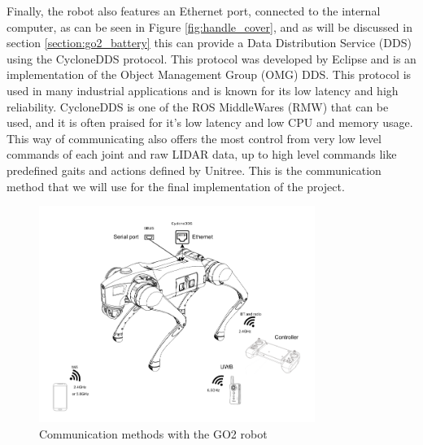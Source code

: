 \documentclass[12pt]{article}
\begin{document}
        Finally, the robot also features an Ethernet port, connected to the internal computer, as can be seen in Figure \ref{fig:handle_cover}, and as will be discussed in section \ref{section:go2_battery} this can provide a Data Distribution Service (DDS) using the CycloneDDS protocol. This protocol was developed by Eclipse and is an implementation of the Object Management Group (OMG) DDS. This protocol is used in many industrial applications and is known for its low latency and high reliability. CycloneDDS is one of the ROS MiddleWares (RMW) that can be used, and it is often praised for it's low latency and low CPU and memory usage. This way of communicating also offers the most control from very low level commands of each joint and raw LIDAR data, up to high level commands like predefined gaits and actions defined by Unitree. This is the communication method that we will use for the final implementation of the project.
    

        \begin{figure}[H]
            \centering
            \includegraphics[width=0.8\textwidth]{Images/go2-communication.pdf}
            \caption{Communication methods with the GO2 robot}
            \label{fig:go2_communication}
        \end{figure}

        
\end{document}
